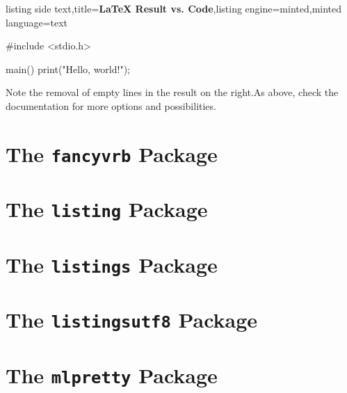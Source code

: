 \documentclass[article,a4paper,oneside,10pt]{memoir}
\newcommand\code[1]{\texttt{#1}}
\begin{document}
\begin{tcblisting}{listing side text,title=\textsf{\bfseries LaTeX Result vs. Code},listing engine=minted,minted language=text}
\begin{verbbox}
#include <stdio.h>

main() {
    print("Hello, world!\n");
}
\end{verbbox}
\fbox{\theverbbox}
\end{tcblisting}

Note the removal of empty lines in the result on the right.As above, check the
documentation \cite{verbatimbox} for more options and possibilities.


\chapter{The \code{fancyvrb} Package \cite{fancyvrb}}
\label{chap:fancyvrb}


\chapter{The \code{listing} Package \cite{listing}}
\label{chap:listing}


\chapter{The \code{listings}      Package \cite{listings}}
\label{chap:listings}


\chapter{The \code{listingsutf8}  Package \cite{listingsutf8}}
\label{chap:listingsutf8}


\chapter{The \code{mlpretty}      Package \cite{mlpretty}}
\label{chap:mlpretty}
\end{document}
